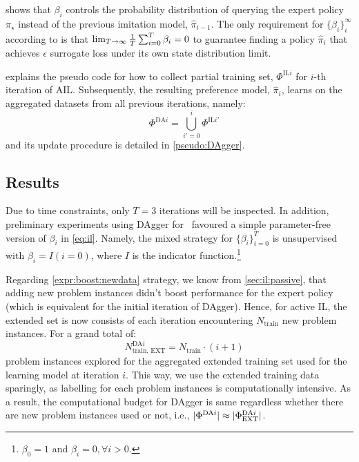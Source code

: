 \documentclass[twocolumn]{svjour3}
\begin{document}
 shows that $\beta_i$ controls the probability distribution of 
querying the expert policy $\pi_\star$ instead of the previous imitation model, 
$\hat{\pi}_{i-1}$. 
The only requirement for $\{\beta_i\}_i^\infty$ according to \cite{RossGB11} is 
that $\limit{\frac{1}{T}\sum_{i=0}^T\beta_i}{T\to\infty}{0}$ to guarantee 
finding a policy $\hat{\pi}_i$ that achieves $\epsilon$ surrogate loss under 
its own state distribution limit.

 explains the pseudo code for how to collect 
partial training set, $\Phi^{\text{IL}i}$ for $i$-th iteration of AIL.
Subsequently, the resulting preference model, $\hat{\pi}_i$, learns on the 
aggregated datasets from all previous iterations, namely:
\begin{equation}\quad\label{eq:DAgger}
\Phi^{\text{DA}i}=\bigcup_{i'=0}^{i}\Phi^{\text{IL}i'}
\end{equation}
and its update procedure is detailed in \cref{pseudo:DAgger}.




\subsection{Results}\label{sec:ail:expr}
Due to time constraints, only $T=3$ iterations will be inspected.
In addition, preliminary experiments using DAgger for \JSP\ favoured a 
simple parameter-free version of $\beta_i$ in \cref{eq:il}. 
Namely, the mixed strategy for $\{\beta_i\}_{i=0}^T$ is unsupervised 
with $\beta_i=I(i=0)$, where $I$ is the indicator 
function.\footnote{$\beta_0=1$ and $\beta_i=0,\forall i>0$.}

Regarding \ref{expr:boost:newdata} strategy, we know from 
\cref{sec:il:passive}, that adding new problem instances didn't boost 
performance for the expert policy (which is equivalent for the initial 
iteration of DAgger). 
Hence, for active IL, the extended set is now consists of each iteration 
encountering $N_{\text{train}}$ new problem instances. For a grand total of: 
\begin{equation}\quad
N^{\text{DA}i}_{\text{train, EXT}}=N_{\text{train}}\cdot (i+1) 
\end{equation}
problem instances explored for the aggregated extended training set used for 
the learning model at iteration $i$.
This way, we use the extended training data sparingly, as labelling for each 
problem instances is computationally intensive. As a result, the computational 
budget for DAgger is same regardless whether there are new problem instances 
used or not, i.e., 
$\abs{\Phi^{\text{DA}i}}\approx\abs{\Phi^{\text{DA}i}_{\text{EXT}}}$.
\end{document}
